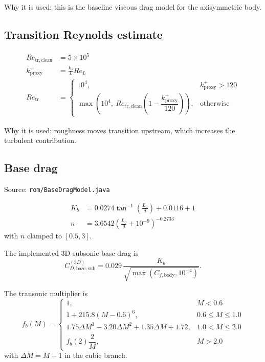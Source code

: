 \documentclass[11pt]{article}
\begin{document}
Why it is used: this is the baseline viscous drag model for the axisymmetric body.

\subsection{Transition Reynolds estimate}
\begin{align*}
Re_{\mathrm{tr,clean}} &= 5\times 10^5 \\
k^+_{\mathrm{proxy}} &= \frac{k_s}{L}Re_L \\
Re_{\mathrm{tr}} &=
\begin{cases}
10^4, & k^+_{\mathrm{proxy}} > 120 \\
\max\!\left(10^4,\ Re_{\mathrm{tr,clean}}\left(1-\dfrac{k^+_{\mathrm{proxy}}}{120}\right)\right), & \text{otherwise}
\end{cases}
\end{align*}

Why it is used: roughness moves transition upstream, which increases the turbulent contribution.

\subsection{Base drag}
Source: \texttt{rom/BaseDragModel.java}

\begin{align*}
K_b &= 0.0274\tan^{-1}\!\left(\frac{L_o}{d}\right) + 0.0116 + 1 \\
n &= 3.6542\left(\frac{L_o}{d}+10^{-9}\right)^{-0.2733}
\end{align*}
with $n$ clamped to $[0.5,3]$.

The implemented 3D subsonic base drag is
\begin{equation*}
C_{D,\mathrm{base,sub}}^{(3D)} = 0.029\,\frac{K_b}{\sqrt{\max(C_{f,\mathrm{body}},10^{-4})}}.
\end{equation*}

The transonic multiplier is
\begin{equation*}
f_b(M)=
\begin{cases}
1, & M<0.6 \\
1 + 215.8(M-0.6)^6, & 0.6 \le M \le 1.0 \\
1.75\Delta M^3 - 3.20\Delta M^2 + 1.35\Delta M + 1.72, & 1.0 < M \le 2.0 \\
f_b(2)\dfrac{2}{M}, & M>2.0
\end{cases}
\end{equation*}
with $\Delta M=M-1$ in the cubic branch.
\end{document}
